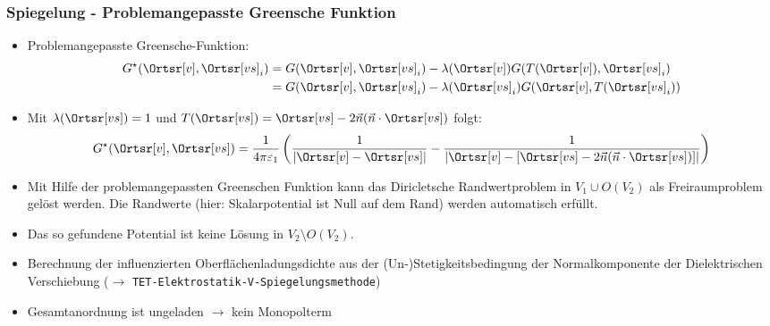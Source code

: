 \begin{frame}
  \frametitle{Spiegelung - Problemangepasste Greensche Funktion}

\begin{itemize}[<+->]
\item Problemangepasste Greensche-Funktion:
      \begin{align*}
         G^\star(\Ortsr[v],\Ortsr[vs]_i) & = G(\Ortsr[v],\Ortsr[vs]_i) -\lambda(\Ortsr[v]) G(T(\Ortsr[v]),\Ortsr[vs]_i)\\
         & = G(\Ortsr[v],\Ortsr[vs]_i) -\lambda(\Ortsr[vs]_i) G(\Ortsr[v],  T(\Ortsr[vs]_i))
      \end{align*}

    \item Mit $\lambda(\Ortsr[vs]) = 1$ und $T(\Ortsr[vs]) = \Ortsr[vs] - 2  \vec{n}  (\vec{n}\cdot \Ortsr[vs])$ folgt:
      \begin{equation*}
        G^\star(\Ortsr[v],\Ortsr[vs]) = \frac{1}{4\pi\varepsilon_1}  \left(  \frac{1}{\left|\Ortsr[v] -  \Ortsr[vs] \right|}  - \frac{1}{\left|\Ortsr[v] -  \left[ \Ortsr[vs] - 2 \vec{n} (\vec{n}\cdot \Ortsr[vs]) \right] \right|}\right)
      \end{equation*}
    \item Mit Hilfe der problemangepassten Greenschen Funktion kann das \alert{Diricletsche Randwertproblem} in $V_1 \cup O(V_2)$ als \alert{Freiraumproblem} gelöst werden. Die Randwerte (hier: Skalarpotential ist Null auf dem Rand) werden automatisch erfüllt.
    \item Das so gefundene Potential ist \alert{keine Lösung} in $V_2 \setminus O(V_2)$.
    \item Berechnung der influenzierten Oberflächenladungsdichte aus der (Un-)Stetigkeitsbedingung der Normalkomponente der Dielektrischen Verschiebung ($\to$ \texttt{TET-Elektrostatik-V-Spiegelungsmethode})
      \item Gesamtanordnung ist \alert{ungeladen} $\to$ kein Monopolterm
    \end{itemize}
  
\end{frame}

